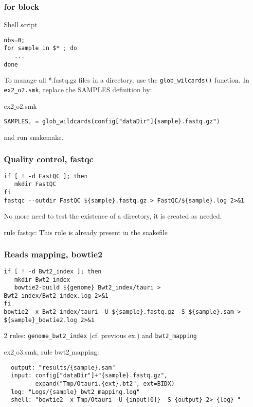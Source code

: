 \begin{frame}[containsverbatim]
\frametitle{for block}
\begin{exampleblock}{Shell script}
\begin{lstlisting}
nbs=0;
for sample in $* ; do 
   ...
done
\end{lstlisting}
\end{exampleblock}
To manage all *.fastq.gz files in a directory, use the \verb|glob_wilcards()| function. In \verb|ex2_o2.smk|, replace the SAMPLES definition by:
\begin{exampleblock}{ex2$\_$o2.smk}
\begin{lstlisting}
SAMPLES, = glob_wildcards(config["dataDir"]{sample}.fastq.gz")
\end{lstlisting}
\end{exampleblock}
and run snakemake.
\end{frame}
\begin{frame}[containsverbatim]
\frametitle{Quality control, fastqc}
\begin{exampleblock}{}
\begin{lstlisting}
if [ ! -d FastQC ]; then
   mkdir FastQC
fi
fastqc --outdir FastQC ${sample}.fastq.gz > FastQC/${sample}.log 2>&1
\end{lstlisting}
\end{exampleblock}
No more need to test the existence of a directory, it is created as needed.
\begin{exampleblock}{rule fastqc:}
This rule is already present in the snakefile
\end{exampleblock}
\end{frame}
\begin{frame}[containsverbatim]
\frametitle{Reads mapping, bowtie2}
\begin{exampleblock}{}
\begin{lstlisting}
if [ ! -d Bwt2_index ]; then
   mkdir Bwt2_index
   bowtie2-build ${genome} Bwt2_index/tauri > Bwt2_index/Bwt2_index.log 2>&1
fi
bowtie2 -x Bwt2_index/tauri -U ${sample}.fastq.gz -S ${sample}.sam > ${sample}_bowtie2.log 2>&1
\end{lstlisting}
\end{exampleblock}
2 rules: \verb|genome_bwt2_index| (cf. previous ex.) and \verb|bwt2_mapping|
\begin{exampleblock}{ex2$\_$o3.smk, rule bwt2$\_$mapping:}
\begin{lstlisting}
  output: "results/{sample}.sam"
  input: config["dataDir"]+"{sample}.fastq.gz",
         expand("Tmp/Otauri.{ext}.bt2", ext=BIDX)
  log: "Logs/{sample}_bwt2_mapping.log"
  shell: "bowtie2 -x Tmp/Otauri -U {input[0]} -S {output} 2> {log} "
\end{lstlisting}
\end{exampleblock}
\end{frame}
